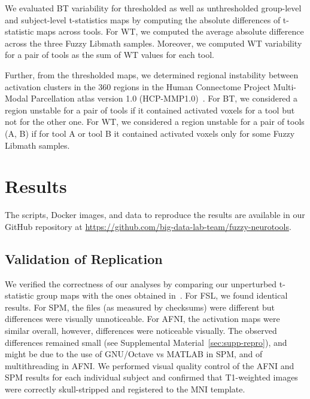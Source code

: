 \documentclass[11pt,onecolumn]{article}
\begin{document}
We evaluated BT variability for thresholded as well as unthresholded
group-level and subject-level t-statistics maps by computing the absolute
differences of t-statistic maps across tools. For WT, we computed the
average absolute difference across the three Fuzzy Libmath samples.
Moreover, we computed WT variability for a pair of tools as the sum of WT values for each tool.

Further, from the thresholded maps, we determined regional instability
between activation clusters in the 360 regions in the Human Connectome
Project Multi-Modal Parcellation atlas version 1.0
(HCP-MMP1.0)~\cite{glasser2016multi}. For BT, we considered a region
unstable for a pair of tools if it contained activated voxels for a tool
but not for the other one. For WT, we considered a region unstable for a
pair of tools (A, B) if for tool A or tool B it contained activated voxels only for some Fuzzy Libmath
samples.

\section{Results}
The scripts, Docker images, and data to reproduce the results are available
in our GitHub repository at
\url{https://github.com/big-data-lab-team/fuzzy-neurotools}.


\subsection{Validation of Replication}

We verified the correctness of our analyses by comparing our unperturbed
t-statistic group maps with the ones obtained
in~\cite{bowring2019exploring}. For FSL, we found
identical results. For SPM, the files (as measured by checksums) were different but differences
were visually unnoticeable. For AFNI, the activation maps were similar
overall, however, differences were noticeable visually.
The observed differences remained small (see Supplemental Material~\ref{sec:supp-repro}), and might be due to the use of
GNU/Octave vs MATLAB in SPM, and of multithreading in AFNI. We performed visual quality control of the AFNI
and SPM results for each individual subject and confirmed that T1-weighted images were
correctly skull-stripped and registered to the MNI template.
\end{document}
